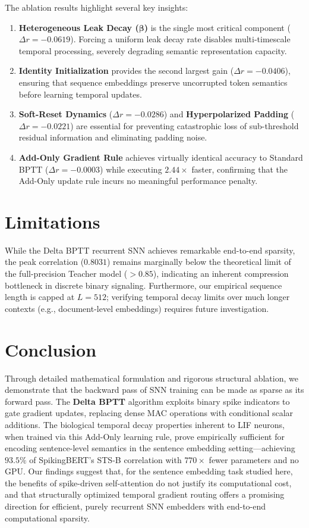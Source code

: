 \documentclass[10pt]{article} %
\begin{document}
The ablation results highlight several key insights:
\begin{enumerate}
    \item \textbf{Heterogeneous Leak Decay ($\bm{\beta}$)} is the single most critical component ($\Delta r = -0.0619$). Forcing a uniform leak decay rate disables multi-timescale temporal processing, severely degrading semantic representation capacity.
    \item \textbf{Identity Initialization} provides the second largest gain ($\Delta r = -0.0406$), ensuring that sequence embeddings preserve uncorrupted token semantics before learning temporal updates.
    \item \textbf{Soft-Reset Dynamics} ($\Delta r = -0.0286$) and \textbf{Hyperpolarized Padding} ($\Delta r = -0.0221$) are essential for preventing catastrophic loss of sub-threshold residual information and eliminating padding noise.
    \item \textbf{Add-Only Gradient Rule} achieves virtually identical accuracy to Standard BPTT ($\Delta r = -0.0003$) while executing $2.44\times$ faster, confirming that the Add-Only update rule incurs no meaningful performance penalty.
\end{enumerate}


\section{Limitations}
While the Delta BPTT recurrent SNN achieves remarkable end-to-end sparsity, the peak correlation ($0.8031$) remains marginally below the theoretical limit of the full-precision Teacher model ($>0.85$), indicating an inherent compression bottleneck in discrete binary signaling. Furthermore, our empirical sequence length is capped at $L=512$; verifying temporal decay limits over much longer contexts (e.g., document-level embeddings) requires future investigation.

\section{Conclusion}
Through detailed mathematical formulation and rigorous structural ablation, we demonstrate that the backward pass of SNN training can be made as sparse as its forward pass. The \textbf{Delta BPTT} algorithm exploits binary spike indicators to gate gradient updates, replacing dense MAC operations with conditional scalar additions. The biological temporal decay properties inherent to LIF neurons, when trained via this Add-Only learning rule, prove empirically sufficient for encoding sentence-level semantics in the sentence embedding setting---achieving $93.5\%$ of SpikingBERT's STS-B correlation with $770\times$ fewer parameters and no GPU. Our findings suggest that, for the sentence embedding task studied here, the benefits of spike-driven self-attention do not justify its computational cost, and that structurally optimized temporal gradient routing offers a promising direction for efficient, purely recurrent SNN embedders with end-to-end computational sparsity.
\end{document}
